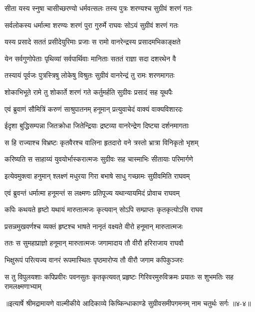\twolineshloka
{सीता यस्य स्नुषा चासीच्छरण्यो धर्मवत्सलः}
{तस्य पुत्रः शरण्यश्च सुग्रीवं शरणं गतः} %

\twolineshloka
{सर्वलोकस्य धर्मात्मा शरण्यः शरणं पुरा}
{गुरुर्मे राघवः सोऽयं सुग्रीवं शरणं गतः} %

\twolineshloka
{यस्य प्रसादे सततं प्रसीदेयुरिमाः प्रजाः}
{स रामो वानरेन्द्रस्य प्रसादमभिकाङ्क्षते} %

\twolineshloka
{येन सर्वगुणोपेताः पृथिव्यां सर्वपार्थिवाः}
{मानिताः सततं राज्ञा सदा दशरथेन वै} %

\twolineshloka
{तस्यायं पूर्वजः पुत्रस्त्रिषु लोकेषु विश्रुतः}
{सुग्रीवं वानरेन्द्रं तु रामः शरणमागतः} %

\twolineshloka
{शोकाभिभूते रामे तु शोकार्ते शरणं गते}
{कर्तुमर्हति सुग्रीवः प्रसादं सह यूथपैः} %

\twolineshloka
{एवं ब्रुवाणं सौमित्रिं करुणं साश्रुपातनम्}
{हनूमान् प्रत्युवाचेदं वाक्यं वाक्यविशारदः} %

\twolineshloka
{ईदृशा बुद्धिसम्पन्ना जितक्रोधा जितेन्द्रियाः}
{द्रष्टव्या वानरेन्द्रेण दिष्ट्या दर्शनमागताः} %

\twolineshloka
{स हि राज्याश्च विभ्रष्टः कृतवैरश्च वालिना}
{हृतदारो वने त्रस्तो भ्रात्रा विनिकृतो भृशम्} %

\twolineshloka
{करिष्यति स साहाय्यं युवयोर्भास्करात्मजः}
{सुग्रीवः सह चास्माभिः सीतायाः परिमार्गणे} %

\twolineshloka
{इत्येवमुक्त्वा हनुमान् श्लक्ष्णं मधुरया गिरा}
{बभाषे साधु गच्छामः सुग्रीवमिति राघवम्} %

\twolineshloka
{एवं ब्रुवन्तं धर्मात्मा हनूमन्तं स लक्ष्मणः}
{प्रतिपूज्य यथान्यायमिदं प्रोवाच राघवम्} %

\twolineshloka
{कपिः कथयते हृष्टो यथायं मारुतात्मजः}
{कृत्यवान् सोऽपि सम्प्राप्तः कृतकृत्योऽसि राघव} %

\twolineshloka
{प्रसन्नमुखवर्णश्च व्यक्तं हृष्टश्च भाषते}
{नानृतं वक्ष्यते वीरो हनूमान् मारुतात्मजः} %

\twolineshloka
{ततः स सुमहाप्राज्ञो हनूमान् मारुतात्मजः}
{जगामादाय तौ वीरौ हरिराजाय राघवौ} %

\twolineshloka
{भिक्षुरूपं परित्यज्य वानरं रूपमास्थितः}
{पृष्ठमारोप्य तौ वीरौ जगाम कपिकुञ्जरः} %

\twolineshloka
{स तु विपुलयशाः कपिप्रवीरः पवनसुतः कृतकृत्यवत् प्रहृष्टः}
{गिरिवरमुरुविक्रमः प्रयातः स शुभमतिः सह रामलक्ष्मणाभ्याम्} %


॥इत्यार्षे श्रीमद्रामायणे वाल्मीकीये आदिकाव्ये किष्किन्धाकाण्डे सुग्रीवसमीपगमनम् नाम चतुर्थः सर्गः ॥४-४॥
